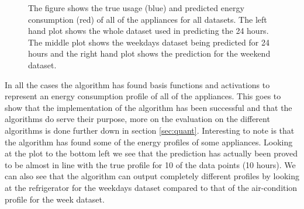 \begin{figure}[H]
	\caption{The figure shows the true usage (blue) and predicted energy consumption (red) of all of the appliances for all datasets. The left hand plot shows the whole dataset used in predicting the 24 hours. The middle plot shows the weekdays dataset being predicted for 24 hours and the right hand plot shows the prediction for the weekend dataset.}
	\label{fig:subset}
\end{figure}


In all the cases the algorithm has found basis functions and activations to represent an energy consumption profile of all of the appliances. This goes to show that the implementation of the algorithm has been successful and that the algorithms do serve their purpose, more on the evaluation on the different algorithms is done further down in section \ref{sec:quant}. Interesting to note is that the algorithm has found some of the energy profiles of some appliances. Looking at the plot to the bottom left we see that the prediction has actually been proved to be almost in line with the true profile for 10 of the data points (10 hours). We can also see that the algorithm can output completely different profiles by looking at the refrigerator for the weekdays dataset compared to that of the air-condition profile for the week dataset. 


